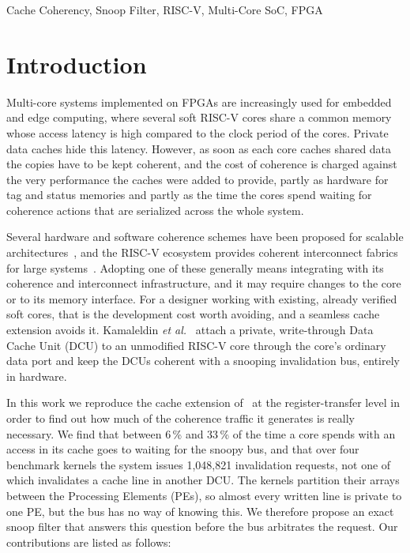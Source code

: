 \documentclass[conference]{IEEEtran}
\begin{document}
\begin{IEEEkeywords}
Cache Coherency, Snoop Filter, RISC-V, Multi-Core SoC, FPGA
\end{IEEEkeywords}

\section{Introduction}

Multi-core systems implemented on FPGAs are increasingly used for embedded and
edge computing, where several soft RISC-V cores share a common memory whose
access latency is high compared to the clock period of the cores. Private data
caches hide this latency. However, as soon as each core caches shared data
the copies have to be kept coherent, and the cost of coherence is charged
against the very performance the caches were added to provide, partly as
hardware for tag and status memories and partly as the time the cores spend
waiting for coherence actions that are serialized across the whole system.

Several hardware and software coherence schemes have been proposed for
scalable architectures~\cite{jetty,cgct,regionscout}, and the RISC-V ecosystem
provides coherent interconnect fabrics for large
systems~\cite{tilelink,openpiton,cifer}. Adopting one of these generally means
integrating with its coherence and interconnect infrastructure, and it may
require changes to the core or to its memory interface. For a designer working
with existing, already verified soft cores, that is the development cost worth
avoiding, and a seamless cache extension avoids it. Kamaleldin \emph{et
al.}~\cite{kamaleldin2024} attach a private, write-through Data Cache Unit
(DCU) to an unmodified RISC-V core through the core's ordinary data port and
keep the DCUs coherent with a snooping invalidation bus, entirely in
hardware.

In this work we reproduce the cache extension of~\cite{kamaleldin2024} at the
register-transfer level in order to find out how much of the coherence traffic
it generates is really necessary. We find that between 6\,\% and 33\,\% of
the time a core spends with an access in its cache goes to waiting for the
snoopy bus, and that over four benchmark kernels the system issues 1{,}048{,}821 invalidation
requests, not one of which invalidates a cache line in another DCU. The
kernels partition their arrays between the Processing Elements (PEs), so
almost every written line is private to one PE, but the bus has no way of
knowing this. We therefore propose an exact snoop filter that answers this
question before the bus arbitrates the request. Our contributions are listed
as follows:
\end{document}
